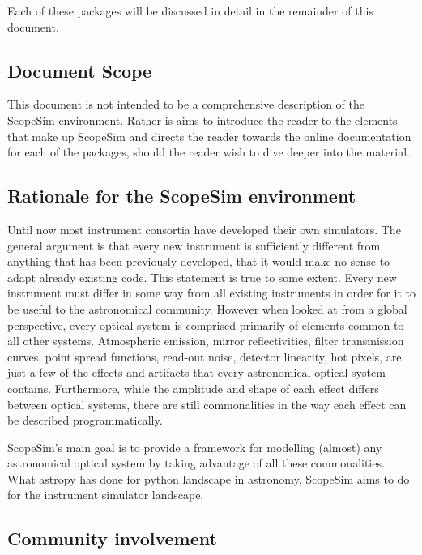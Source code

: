 Each of these packages will be discussed in detail in the remainder of this document.


\subsection{Document Scope%
  \label{document-scope}%
}

This document is not intended to be a comprehensive description of the ScopeSim environment. Rather is aims to introduce the reader to the elements that make up ScopeSim and directs the reader towards the online documentation for each of the packages, should the reader wish to dive deeper into the material.


\subsection{Rationale for the ScopeSim environment%
  \label{rationale-for-the-scopesim-environment}%
}

Until now most instrument consortia have developed their own simulators.
The general argument is that every new instrument is sufficiently different from anything that has been previously developed, that it would make no sense to adapt already existing code.
This statement is true to some extent.
Every new instrument must differ in some way from all existing instruments in order for it to be useful to the astronomical community.
However when looked at from a global perspective, every optical system is comprised primarily of elements common to all other systems.
Atmospheric emission, mirror reflectivities, filter transmission curves, point spread functions, read-out noise, detector linearity, hot pixels, are just a few of the effects and artifacts that every astronomical optical system contains.
Furthermore, while the amplitude and shape of each effect differs between optical systems, there are still commonalities in the way each effect can be described programmatically.

ScopeSim's main goal is to provide a framework for modelling (almost) any astronomical optical system by taking advantage of all these commonalities.
What astropy has done for python landscape in astronomy, ScopeSim aims to do for the instrument simulator landscape.


\subsection{Community involvement%
  \label{community-involvement}%
}

